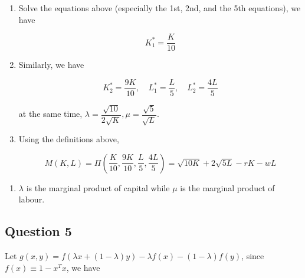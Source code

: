 \documentclass[
]{article}
\begin{document}
\begin{enumerate}
\[\begin{array}{l}
  \dfrac{\partial L}{\partial \lambda}=0\\

  \dfrac{\partial L}{\partial \mu}=0

  \end{array}\right.\quad\Rightarrow\quad \left\{\begin{array}{l}

  \dfrac{1}{2\sqrt{K_1}}-\lambda=0\\

  \dfrac{3}{2\sqrt{K_2}}-\lambda=0\\

  \dfrac{1}{\sqrt{L_1}}-\mu=0\\

  \dfrac{2}{\sqrt{L_2}}-\mu=0\\

  K_1+K_2-K=0\\

  L_1+L_2-L=0

  \end{array}\right.\]
\item
  Solve the equations above (especially the 1st, 2nd, and the 5th
  equations), we have

  \[K_1^*=\dfrac{K}{10}\]
\item
  Similarly, we have

  \[K_2^*=\dfrac{9K}{10},\quad L_1^*=\dfrac{L}{5},\quad L_2^*=\dfrac{4L}{5}\]

  at the same time,
  \(\lambda = \dfrac{\sqrt{10}}{2\sqrt{K}},\mu=\dfrac{\sqrt{5}}{\sqrt{L}}\).
\item
  Using the definitions above,

  \[M(K,L)=\Pi\left(\dfrac{K}{10},\dfrac{9K}{10},\dfrac{L}{5},\dfrac{4L}{5}\right)=\sqrt{10K}+2\sqrt{5L}-rK-wL\]
\end{enumerate}

\begin{enumerate}
\def\labelenumi{\arabic{enumi}.}
\item
  \(\lambda\) is the marginal product of capital while \(\mu\) is the
  marginal product of labour.
\end{enumerate}

\hypertarget{question-5}{%
\subsection{Question 5}\label{question-5}}

Let \(g(x,y)=f(\lambda x+(1-\lambda)y)-\lambda f(x)-(1-\lambda)f(y)\),
since \(f(x)\equiv 1-x^T x\), we have
\end{document}
